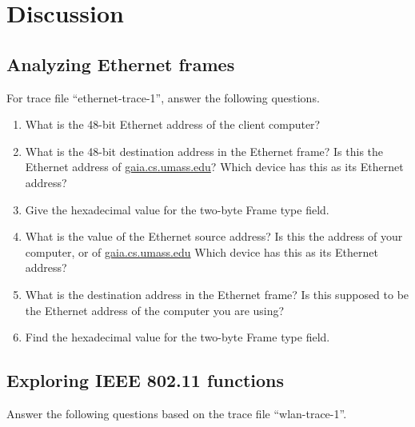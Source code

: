 \section{Discussion}

\subsection{Analyzing Ethernet frames}\label{Dis_Ethernet}
\noindent For trace file ``ethernet-trace-1'', answer the following questions.
\begin{enumerate}
\item What is the 48-bit Ethernet address of the client computer?

\item What is the 48-bit destination address in the Ethernet frame? Is this the Ethernet address of \url{gaia.cs.umass.edu}? Which device has this as its Ethernet address?

\item Give the hexadecimal value for the two-byte Frame type field.

\item What is the value of the Ethernet source address? Is this the address of your computer, or of \url{gaia.cs.umass.edu} Which device has this as its Ethernet address?

\item What is the destination address in the Ethernet frame? Is this supposed to be the Ethernet address of the computer you are using?

\item Find the hexadecimal value for the two-byte Frame type field.

\end{enumerate}

\subsection{Exploring IEEE 802.11 functions}\label{Dis_WLAN}

\noindent Answer the following questions based on the trace file
``wlan-trace-1''.

